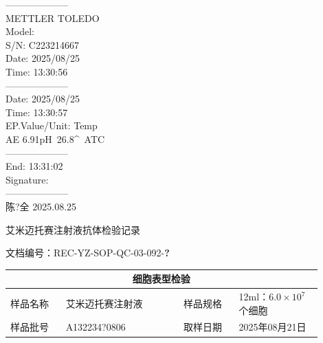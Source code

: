 \documentclass[UTF8,10pt,a4paper,fontset=fandol]{ctexart}
\newcommand{\fieldvalue}[1]{#1}
\newcommand{\handwritten}[1]{#1}
\begin{document}
\begin{flushleft}
--------------------\\
METTLER TOLEDO\\
Model:\\
S/N: %
\fieldvalue{C223214667}\\
Date: %
\fieldvalue{2025/08/25}\\
Time: %
\fieldvalue{13:30:56}\\
\hspace*{1em}--------------------\\
Date: %
\fieldvalue{2025/08/25}\\
Time: %
\fieldvalue{13:30:57}\\
EP.Value/Unit: %
\fieldvalue{Temp}\\
AE %
\fieldvalue{6.91pH\ 26.8^{\circ}\ ATC}\\[1em]
--------------------\\
End: %
\fieldvalue{13:31:02}\\
Signature:\\
--------------------\\[1em]

\handwritten{陈?全}\quad
\handwritten{2025.08.25}
\end{flushleft}

\newpage

\begin{center}
{\large 艾米迈托赛注射液抗体检验记录}
\end{center}

\noindent 文档编号：REC-YZ-SOP-QC-03-092-\textbf{?}

\begin{tabular}{|p{0.16\linewidth}|p{0.34\linewidth}|p{0.16\linewidth}|p{0.24\linewidth}|}
\hline
\multicolumn{4}{|c|}{细胞表型检验}\\
\hline
样品名称 & 艾米迈托赛注射液 & 样品规格 & 12ml：$6.0\times10^7$个细胞\\
\hline
样品批号 &
\fieldvalue{\handwritten{A132234?0806}} &
取样日期 &
\fieldvalue{\handwritten{2025年08月21日}}\\
\hline
\end{tabular}
\end{document}
